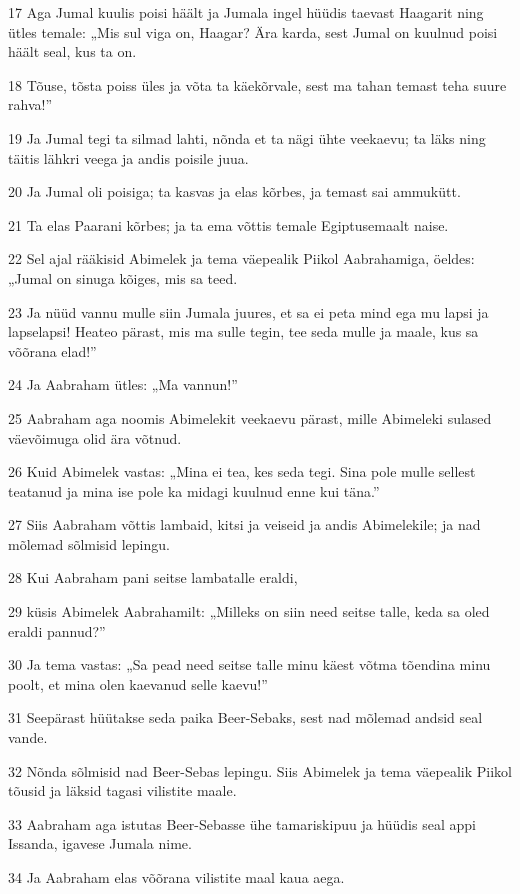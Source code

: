 \par 17 Aga Jumal kuulis poisi häält ja Jumala ingel hüüdis taevast Haagarit ning ütles temale: „Mis sul viga on, Haagar? Ära karda, sest Jumal on kuulnud poisi häält seal, kus ta on.
\par 18 Tõuse, tõsta poiss üles ja võta ta käekõrvale, sest ma tahan temast teha suure rahva!”
\par 19 Ja Jumal tegi ta silmad lahti, nõnda et ta nägi ühte veekaevu; ta läks ning täitis lähkri veega ja andis poisile juua.
\par 20 Ja Jumal oli poisiga; ta kasvas ja elas kõrbes, ja temast sai ammukütt.
\par 21 Ta elas Paarani kõrbes; ja ta ema võttis temale Egiptusemaalt naise.
\par 22 Sel ajal rääkisid Abimelek ja tema väepealik Piikol Aabrahamiga, öeldes: „Jumal on sinuga kõiges, mis sa teed.
\par 23 Ja nüüd vannu mulle siin Jumala juures, et sa ei peta mind ega mu lapsi ja lapselapsi! Heateo pärast, mis ma sulle tegin, tee seda mulle ja maale, kus sa võõrana elad!”
\par 24 Ja Aabraham ütles: „Ma vannun!”
\par 25 Aabraham aga noomis Abimelekit veekaevu pärast, mille Abimeleki sulased väevõimuga olid ära võtnud.
\par 26 Kuid Abimelek vastas: „Mina ei tea, kes seda tegi. Sina pole mulle sellest teatanud ja mina ise pole ka midagi kuulnud enne kui täna.”
\par 27 Siis Aabraham võttis lambaid, kitsi ja veiseid ja andis Abimelekile; ja nad mõlemad sõlmisid lepingu.
\par 28 Kui Aabraham pani seitse lambatalle eraldi,
\par 29 küsis Abimelek Aabrahamilt: „Milleks on siin need seitse talle, keda sa oled eraldi pannud?”
\par 30 Ja tema vastas: „Sa pead need seitse talle minu käest võtma tõendina minu poolt, et mina olen kaevanud selle kaevu!”
\par 31 Seepärast hüütakse seda paika Beer-Sebaks, sest nad mõlemad andsid seal vande.
\par 32 Nõnda sõlmisid nad Beer-Sebas lepingu. Siis Abimelek ja tema väepealik Piikol tõusid ja läksid tagasi vilistite maale.
\par 33 Aabraham aga istutas Beer-Sebasse ühe tamariskipuu ja hüüdis seal appi Issanda, igavese Jumala nime.
\par 34 Ja Aabraham elas võõrana vilistite maal kaua aega.


